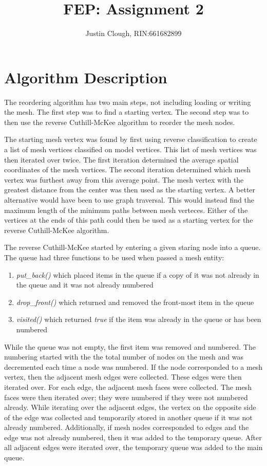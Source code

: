 \documentclass[a4paper, 12pt]{article}
\author{Justin Clough, RIN:661682899}
\title{FEP: Assignment 2}
\begin{document}
\maketitle

\section*{Algorithm Description}

The reordering algorithm has two main steps, not including
loading or writing the mesh. The first step was to find a starting 
vertex. The second step was to then use the reverse Cuthill-McKee 
algorithm to reorder the mesh nodes. 

The starting mesh vertex was found by first using reverse classification 
to create a list of mesh vertices classified on model vertices. 
This list of mesh vertices was then iterated over twice. 
The first iteration determined the average spatial coordinates of the 
mesh vertices. The second iteration determined which mesh vertex was 
furthest away from this average point. The mesh vertex with the greatest
distance from the center was then used as the starting vertex. A better
alternative would have been to use graph traversal. This would 
instead find the maximum length of the minimum paths 
between mesh verteces.  Either of the vertices at the 
ends of this path could then be used as a starting vertex for the 
reverse Cuthill-McKee algorithm. 

The reverse Cuthill-McKee started by entering a given staring node
into a queue. The queue had three functions to be used when passed a 
mesh entity:
\begin{enumerate}
  \item \emph{put\_back()} which placed items in the queue if 
          a copy of it was not already in the queue and 
          it was not already numbered
  \item \emph{drop\_front()} which returned and removed the 
          front-most item in the queue
  \item \emph{visited()} which returned \emph{true} if the item was
          already in the queue or has been numbered
\end{enumerate}
While the queue was not empty, the first item was removed and numbered.
The numbering started with the the total number of nodes on the mesh
and was decremented each time a node was numbered. If the node 
corresponded to a mesh vertex, then the adjacent mesh edges were
collected. These edges were then iterated over. For each edge, the
adjacent mesh faces were collected. The mesh faces were then iterated
over; they were numbered if they were not numbered already. While 
iterating over the adjacent edges, the vertex on the opposite 
side of the edge was collected and temporarily stored in another queue
if it was not already numbered. Additionally, if mesh nodes 
corresponded to edges and the edge was not already numbered, then it 
was added to the temporary queue. After all adjacent edges were iterated
over, the temporary queue was added to the main queue. 
\end{document}

